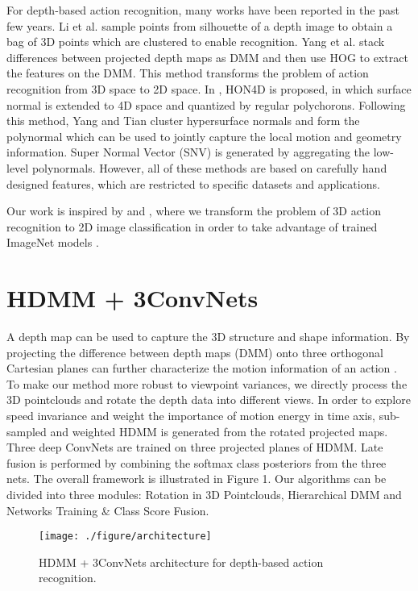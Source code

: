 \documentclass[conference]{IEEEtran}
\begin{document}
For depth-based action recognition, many works have been reported in the past few years. Li et al. \cite{Li2010} sample points from silhouette of a depth image to obtain a bag of 3D points which are clustered to enable recognition. Yang et al. \cite{Yang2012a} stack differences between projected depth maps as DMM and then use HOG to extract the features on the DMM. This method transforms the problem of action recognition from 3D space to 2D space. In \cite{Oreifej2013}, HON4D is proposed, in which surface normal is extended to 4D space and quantized by regular polychorons. Following this method, Yang and Tian \cite{yangsuper} cluster hypersurface normals and form the polynormal which can be used to jointly capture the local motion and geometry information. Super Normal Vector (SNV) is generated by aggregating the low-level polynormals. However, all of these methods are based on carefully hand designed features, which are restricted to specific datasets and applications.

Our work is inspired by \cite{Yang2012a} and \cite{simonyan2014two}, where we transform the problem of 3D action recognition to 2D image classification in order to take advantage of trained ImageNet models \cite{krizhevsky2012imagenet}.


\section{HDMM + 3ConvNets}
A depth map can be used to capture the 3D structure and shape information. By projecting the difference between depth maps (DMM) onto three orthogonal Cartesian planes can further characterize the motion information of an action \cite{Yang2012a}. To make our method more robust to viewpoint variances, we directly process the 3D pointclouds and rotate the depth data into different views. In order to explore speed invariance and weight the importance of motion energy in time axis, sub-sampled and weighted HDMM is generated from the rotated projected maps. Three deep ConvNets are trained on three projected planes of HDMM. Late fusion is performed by combining the softmax class posteriors from the three nets. The overall framework is illustrated in Figure 1. Our algorithms can be divided into three modules: Rotation in 3D Pointclouds, Hierarchical DMM and Networks Training \& Class Score Fusion.

\begin{figure*}[!ht]
\begin{center}{\texttt{[image: ./figure/architecture]}}
\end{center}
\caption{HDMM + 3ConvNets architecture for depth-based action recognition.}
\label{fig:framework}
\end{figure*}
\end{document}
